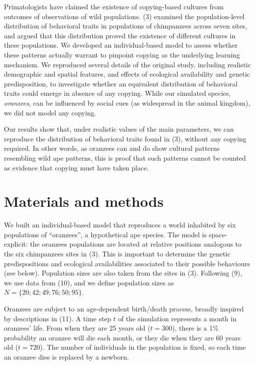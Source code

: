 \documentclass[9pt,twocolumn,twoside,]{pnas-new}
\begin{document}
Primatologists have claimed the existence of copying-based cultures from
outcomes of observations of wild populations. (3) examined the
population-level distribution of behavioral traits in populations of
chimpanzees across seven sites, and argued that this distribution proved
the existence of different cultures in these populations. We developed
an individual-based model to assess whether these patterns actually
warrant to pinpoint copying as the underlying learning mechanism. We
reproduced several details of the original study, including realistic
demographic and spatial features, and effects of ecological availability
and genetic predisposition, to investigate whether an equivalent
distribution of behavioral traits could emerge in absence of any
copying. While our simulated species, \emph{oranzees}, can be influenced
by social cues (as widespread in the animal kingdom), we did not model
any copying.

Our results show that, under realistic values of the main parameters, we
can reproduce the distribution of behavioral traits found in (3),
without any copying required. In other words, as oranzees can and do
show cultural patterns resembling wild ape patterns, this is proof that
such patterns cannot be counted as evidence that copying must have taken
place.

\section*{Materials and methods}\label{materials-and-methods}

We built an individual-based model that reproduces a world inhabited by
six populations of ``oranzees'', a hypothetical ape species. The model
is space-explicit: the oranzees populations are located at relative
positions analogous to the six chimpanzees sites in (3). This is
important to determine the genetic predispositions and ecological
availabilities associated to their possible behaviours (see below).
Population sizes are also taken from the sites in (3). Following (9), we
use data from (10), and we define population sizes as
\(N=\{20;42;49;76;50;95\}\).

Oranzees are subject to an age-dependent birth/death process, broadly
inspired by descriptions in (11). A time step \(t\) of the simulation
represents a month in oranzees' life. From when they are 25 years old
(\(t=300\)), there is a 1\% probability an oranzee will die each month,
or they die when they are 60 years old (\(t=720\)). The number of
individuals in the population is fixed, so each time an oranzee dies is
replaced by a newborn.
\end{document}
